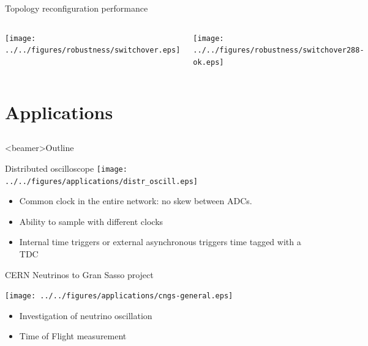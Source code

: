 \documentclass[compress,red]{beamer}
\begin{document}
\begin{frame}{Topology reconfiguration performance}

\begin{columns}[c]

    \begin{center}
    \texttt{[image: ../../figures/robustness/switchover.eps]} 
    \end{center}

    \begin{center}
    \texttt{[image: ../../figures/robustness/switchover288-ok.eps]}
    \end{center}

\end{columns}
\end{frame}

\section{Applications}
\subsection{}
\begin{frame}<beamer>{Outline}
    \tableofcontents [currentsection]
\end{frame}

\begin{frame}{Distributed oscilloscope}
  \texttt{[image: ../../figures/applications/distr\_oscill.eps]}
  \begin{block}{}
    \begin{itemize}
      \item Common clock in the entire network: no skew between ADCs.
      \item Ability to sample with different clocks
      \item Internal time triggers or external asynchronous triggers time tagged
        with a TDC
    \end{itemize}
  \end{block}
\end{frame}

\begin{frame}{CERN Neutrinos to Gran Sasso project}
  \begin{center}
    \texttt{[image: ../../figures/applications/cngs-general.eps]}
  \end{center}
  \begin{itemize}
    \item Investigation of neutrino oscillation
    \item Time of Flight measurement
  \end{itemize}
\end{frame}
\end{document}
